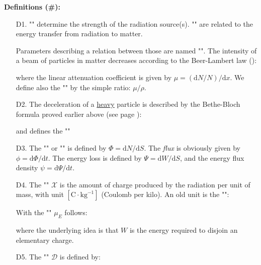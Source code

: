 	\textbf{Definitions (\#\mydef):}
	\begin{enumerate}
		\item[D1.] "" determine the strength of the radiation source(s). "" are related to the energy transfer from radiation to matter. 
		
		Parameters describing a relation between those are named "". The intensity of a beam of particles in matter decreases according to the Beer-Lambert law ():
		 
		where the linear attenuation coefficient is given by $\mu=(\mathrm{d}N/N)/\mathrm{d}x$. We define also the "" by the simple ratio: $\mu/\rho$.
		
		\item[D2.] The deceleration of a \underline{heavy} particle is described by the Bethe-Bloch formula proved earlier above (see page \pageref{bethe formula}):
		
		and defines the ""
		
		\item[D3.] The "" or "" is defined by $\Phi=\mathrm{d}N/\mathrm{d}S$. The {\it flux} is obviously given by $\phi=\mathrm{d}\Phi/\mathrm{d}t$. The energy loss is defined by $\Psi=\mathrm{d}W/\mathrm{d}S$, and the energy flux density $\psi=\mathrm{d}\Psi/\mathrm{d}t$. 
		
		\item[D4.] The "" $\mathcal{X}$ is the amount of charge produced by the radiation per unit of mass, with unit $[\text{C}\cdot\text{kg}^{-1}]$ (Coulomb per kilo). An old unit is the "":
		
		With the "" $\mu_E$ follows:
		
		where the underlying idea is that $W$ is the energy required to disjoin an elementary charge.
		
		\item[D5.] The "" $\mathcal{D}$ is defined by:
		

\end{enumerate}
